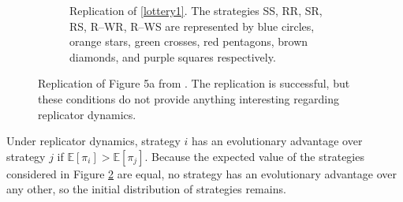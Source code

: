 \begin{figure}[!h]
\begin{subfigure}[b]{0.45\textwidth}
    \caption{Replication of \ref{lottery1}. The strategies SS, RR, SR, RS, R--WR, R--WS are represented by blue circles, orange stars, green crosses, red pentagons, brown diamonds, and purple squares respectively.}
    \label{lottery1_me}
  \end{subfigure}
  \caption{Replication of Figure 5a from \cite{RN30}. The replication is successful, but these conditions do not provide anything interesting regarding replicator dynamics.  } \label{lottery_comp0}
\end{figure} 
\FloatBarrier
Under replicator dynamics, strategy $i$ has an evolutionary advantage over strategy $j$ if $\mathbb E [\pi_i] >\mathbb E [\pi_j]$. Because the expected value of the strategies considered in Figure \ref{lottery_comp0} are equal, no strategy has an evolutionary advantage over any other, so the initial distribution of strategies remains.
\FloatBarrier 
